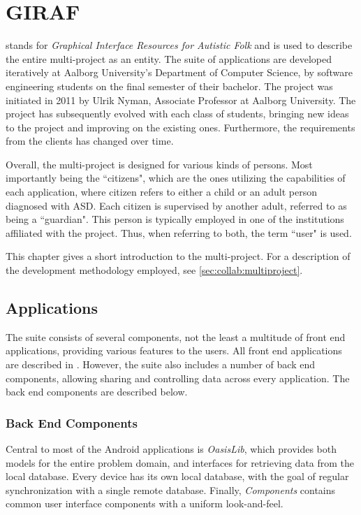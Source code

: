 \chapter{GIRAF}\label{chap:giraf}
\giraf  stands for \textit{Graphical Interface Resources for Autistic Folk} and is used to describe the entire multi-project as an entity.
The suite of \giraf applications are developed iteratively at Aalborg University's Department of Computer Science, by software engineering students on the final semester of their bachelor.
The project was initiated in 2011 by Ulrik Nyman, Associate Professor at Aalborg University.
The project has subsequently evolved with each class of students, bringing new ideas to the project and improving on the existing ones.
Furthermore, the requirements from the clients has changed over time.

Overall, the multi-project is designed for various kinds of persons.
Most importantly being the ``citizens", which are the ones utilizing the capabilities of each application, where citizen refers to either a child or an adult person diagnosed with ASD.
Each citizen is supervised by another adult, referred to as being a ``guardian".
This person is typically employed in one of the institutions affiliated with the \giraf project.
Thus, when referring to both, the term ``user" is used.

This chapter gives a short introduction to the \giraf multi-project.
For a description of the development methodology employed, see \cref{sec:collab:multiproject}.

\section{\giraf Applications}\label{sec:giraf:applications}
The \giraf suite consists of several components, not the least a multitude of front end applications, providing various features to the users. 
All front end applications are described in . 
However, the suite also includes a number of back end components, allowing sharing and controlling data across every application. 
The back end components are described below.


\subsection{Back End Components}
\label{sec:giraf:applications:backend}
Central to most of the Android applications is \textit{OasisLib}, which provides both models for the entire problem domain, and interfaces for retrieving data from the local database.
Every device has its own local database, with the goal of regular synchronization with a single remote database. 
Finally, \textit{\giraf Components} contains common user interface components with a uniform look-and-feel. 

